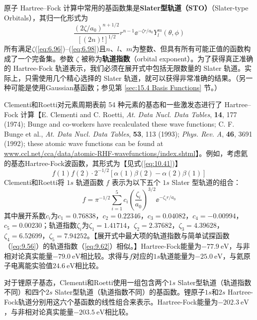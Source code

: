     原子 Hartree–Fock 计算中常用的基函数集是\textbf{Slater型轨道（STO）}（Slater-type Orbitals），其归一化形式为
    \begin{equation}
        \frac{\left(2\zeta/a_0\right)^{n+1/2}}{\left[\left(2n\right)!\right]^{1/2}}r^{n-1}\ee ^{-\zeta r/a_0}Y_l^m\left(\theta, \phi\right)
        \label{eq:11.14}
    \end{equation}
    所有满足$\zeta$(\ref{eq:6.96})–(\ref{eq:6.98})且$n$、$l$、$m$为整数、但具有所有可能正值的函数构成了一个完备集。参数 $\zeta$ 被称为\textbf{轨道指数}（orbital exponent）。为了获得真正准确的 Hartree-Fock 轨道表示，我们必须在展开式中包括无限数量的 Slater 轨道。实际上，只需使用几个精心选择的 Slater 轨道，就可以获得非常准确的结果。（另一种可能是使用Gaussian基函数；参见第 \ref{sec:15.4 Basis Functions} 节。）

    Clementi和Roetti对元素周期表前 54 种元素的基态和一些激发态进行了 Hartree–Fock 计算【E. Clementi and C. Roetti, \textit{At. Data Nucl. Data Tables}, \textbf{14}, 177 (1974); Bunge and co-workers have recalculated these wave functions; C. F. Bunge et al., \textit{At. Data Nucl. Data Tables}, \textbf{53}, 113 (1993); \textit{Phys. Rev. A}, \textbf{46}, 3691 (1992); these atomic wave functions can be found at \url{www.ccl.net/cca/data/atomic-RHF-wavefunctions/index.shtml}】。例如，考虑氦的基态Hartree-Fock波函数，其形式为【见式(\ref{eq:10.41})】
    \begin{equation*}
        f(1) f(2) \cdot 2^{-1/2} \left[ \alpha(1) \beta(2) - \alpha(2) \beta(1) \right]
    \end{equation*}
    Clementi和Roetti将 $1s$ 轨道函数 $f$ 表示为以下五个 $1s$ Slater 型轨道的组合：
    \begin{equation*}
        f = \pi^{-1/2} \sum_{i=1}^{5} c_i \left( \frac{\zeta_i}{a_0} \right)^{3/2} \ee ^{-\zeta_i r / a_0}
    \end{equation*}
    其中展开系数$c_i$为$c_1 = 0.76838$，$c_2 = 0.22346$，$c_3 = 0.04082$，$c_4 = -0.00994$，$c_5 = 0.00230$；轨道指数$\zeta_i$为$\zeta_1 = 1.41714$，$\zeta_2 = 2.37682$，$\zeta_3 = 4.39628$，$\zeta_4 = 6.52699$，$\zeta_5 = 7.94252$。【展开式中最大项的轨道指数与简单试探函数（\ref{eq:9.56}）的轨道指数（\ref{eq:9.62}）相似。】Hartree-Fock能量为$-77.9 \: \mathrm{eV}$，与非相对论真实能量$-79.0 \:\mathrm{eV}$相比较。求得与$f$对应的$1s$轨道能量为$-25.0 \:\mathrm{eV}$，与氦原子电离能实验值$24.6 \:\mathrm{eV}$相比较。

    对于锂原子基态，Clementi和Roetti使用一组包含两个$1s$ Slater型轨道（轨道指数不同）和四个$2s$ Slater型轨道（轨道指数不同）的基函数。锂原子$1s$和$2s$ Hartree-Fock轨道分别用这六个基函数的线性组合来表示。Hartree-Fock能量为$-202.3 \:\mathrm{eV}$，与非相对论真实能量$-203.5 \:\mathrm{eV}$相比较。

